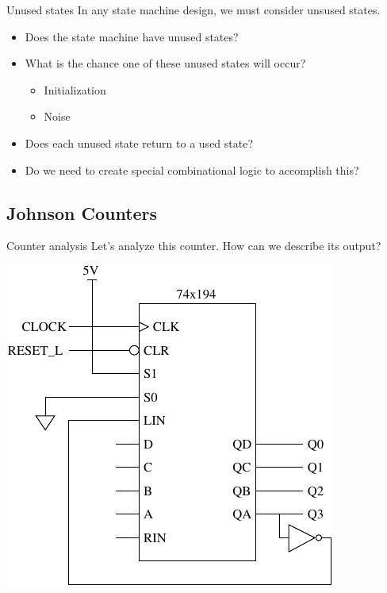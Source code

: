 \begin{frame}{Unused states}
  In any state machine design, we must consider unsused states.
  \begin{itemize}
    \item Does the state machine have unused states?
    \item What is the chance one of these unused states will occur?
      \begin{itemize}
        \item Initialization
        \item Noise
      \end{itemize}
    \item Does each unused state return to a used state?
    \item Do we need to create special combinational logic to accomplish this?
  \end{itemize}
\end{frame}

\subsection{Johnson Counters}

\begin{frame}{Counter analysis}
  Let's analyze this counter.  How can we describe its output?
  \begin{center}
    \includegraphics[scale=0.9]{74x194JohnsonCounterSchematic}
  \end{center}
\end{frame}

